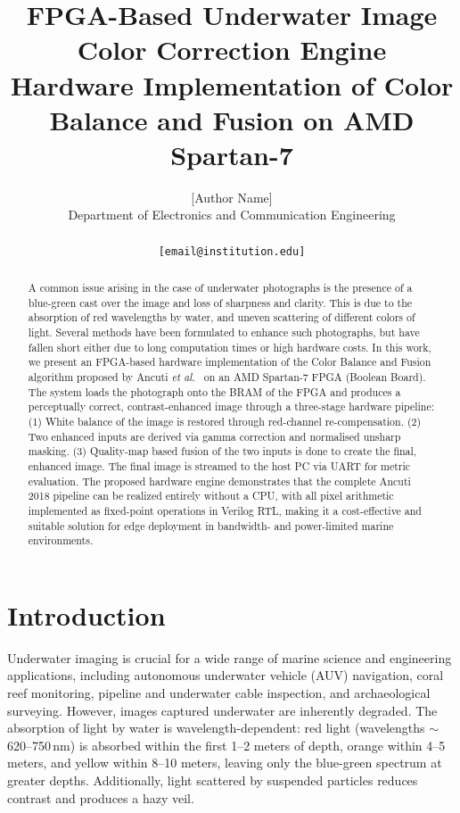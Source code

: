 \documentclass[10pt,twocolumn,letterpaper]{article}
\begin{document}
\title{FPGA-Based Underwater Image Color Correction Engine\\
\large{Hardware Implementation of Color Balance and Fusion on AMD Spartan-7}}

\author{
  [Author Name]\\
  Department of Electronics and Communication Engineering\\
  [Institution Name]\\
  {\tt\small [email@institution.edu]}
}
\maketitle

\begin{abstract}
  A common issue arising in the case of underwater photographs is the presence of a blue-green cast over the image and loss of sharpness and clarity. This is due to the absorption of red wavelengths by water, and uneven scattering of different colors of light. Several methods have been formulated to enhance such photographs, but have fallen short either due to long computation times or high hardware costs. In this work, we present an FPGA-based hardware implementation of the Color Balance and Fusion algorithm proposed by Ancuti \emph{et al.}~\cite{ancuti2018color} on an AMD Spartan-7 FPGA (Boolean Board). The system loads the photograph onto the BRAM of the FPGA and produces a perceptually correct, contrast-enhanced image through a three-stage hardware pipeline:(1) White balance of the image is restored through red-channel re-compensation. (2)  Two enhanced inputs are derived via gamma correction and normalised unsharp masking. (3) Quality-map based fusion of the two inputs is done to create the final, enhanced image. The final image is streamed to the host PC via UART for metric evaluation. The proposed hardware engine demonstrates that the complete Ancuti 2018 pipeline can be realized entirely without a CPU, with all pixel arithmetic implemented as fixed-point operations in Verilog RTL, making it a cost-effective and suitable solution for edge deployment in bandwidth- and power-limited marine environments.
\end{abstract}

\section{Introduction}
\label{sec:intro}

Underwater imaging is crucial for a wide range of marine science and
engineering applications, including autonomous underwater vehicle (AUV)
navigation, coral reef monitoring, pipeline and underwater cable inspection, and archaeological
surveying. However, images captured underwater are inherently degraded.
The absorption of light by water is wavelength-dependent: red light
(wavelengths $\sim$620--750\,nm) is absorbed within the first 1--2 meters
of depth, orange within 4--5 meters, and yellow within 8--10 meters, leaving
only the blue-green spectrum at greater depths. Additionally, light
scattered by suspended particles reduces contrast and produces a hazy veil.
\end{document}
